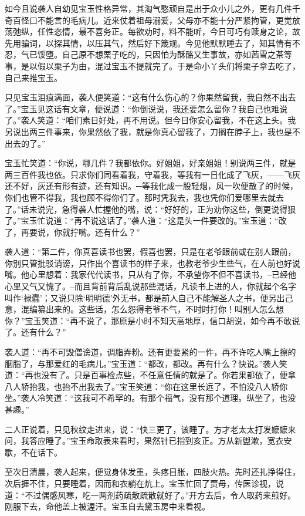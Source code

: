 \documentclass[12pt,oneside]{book}
\begin{document}
如今且说袭人自幼见宝玉性格异常，其淘气憨顽自是出于众小儿之外，更有几件千奇百怪口不能言的毛病儿。近来仗着祖母溺爱，父母亦不能十分严紧拘管，更觉放荡弛纵，任性恣情，最不喜务正。每欲劝时，料不能听，今日可巧有赎身之论，故先用骗词，以探其情，以压其气，然后好下箴规。今见他默默睡去了，知其情有不忍，气已馁堕。自己原不想栗子吃的，只因怕为酥酪又生事故，亦如茜雪之茶等事，是以假以栗子为由，混过宝玉不提就完了。于是命小丫头们将栗子拿去吃了，自己来推宝玉。

只见宝玉泪痕满面，袭人便笑道：“这有什么伤心的？你果然留我，我自然不出去了。”宝玉见这话有文章，便说道︰“你倒说说，我还要怎么留你？我自己也难说了。”袭人笑道：“咱们素日好处，再不用说。但今日你安心留我，不在这上头。我另说出两三件事来，你果然依了我，就是你真心留我了，刀搁在脖子上，我也是不出去的了。”

宝玉忙笑道：“你说，哪几件？我都依你。好姐姐，好亲姐姐！别说两三件，就是两三百件我也依。只求你们同看着我，守着我，等我有一日化成了飞灰，——飞灰还不好，灰还有形有迹，还有知识。─等我化成一股轻烟，风一吹便散了的时候，你们也管不得我，我也顾不得你们了。那时凭我去，我也凭你们爱哪里去就去了。”话未说完，急得袭人忙握他的嘴，说：“好好的，正为劝你这些，倒更说得狠了。”宝玉忙说道：“再不说这话了。”袭人道：“这是头一件要改的。”宝玉道：“改了，再要说，你就拧嘴。还有什么？”

袭人道：“第二件，你真喜读书也罢，假喜也罢，只是在老爷跟前或在别人跟前，你别只管批驳诮谤，只作出个喜读书的样子来，也教老爷少生些气，在人前也好说嘴。他心里想着：我家代代读书，只从有了你，不承望你不但不喜读书，--已经他心里又气又愧了。--而且背前背后乱说那些混话，凡读书上进的人，你就起个名字叫作‘禄蠹’；又说只除‘明明德’外无书，都是前人自己不能解圣人之书，便另出己意，混编纂出来的。这些话，怎么怨得老爷不气，不时时打你！叫别人怎么想你？”宝玉笑道：“再不说了，那原是小时不知天高地厚，信口胡说，如今再不敢说了。还有什么？”

袭人道：“再不可毁僧谤道，调脂弄粉。还有更要紧的一件，再不许吃人嘴上擦的胭脂了，与那爱红的毛病儿。”宝玉道：“都改，都改。再有什么？快说。”袭人笑道：“再也没有了。只是百事检点些，不任意任情的就是了。你若果都依了，便拿八人轿抬我，也抬不出我去了。”宝玉笑道：“你在这里长远了，不怕没八人轿你坐。”袭人冷笑道：“这我可不希罕的。有那个福气，没有那个道理。纵坐了，也没甚趣。”

二人正说着，只见秋纹走进来，说：“快三更了，该睡了。方才老太太打发嬷嬷来问，我答应睡了。”宝玉命取表来看时，果然针已指到亥正。方从新盥漱，宽衣安歇，不在话下。

至次日清晨，袭人起来，便觉身体发重，头疼目胀，四肢火热。先时还扎挣得住，次后捱不住，只要睡着，因而和衣躺在炕上。宝玉忙回了贾母，传医诊视，说道：“不过偶感风寒，吃一两剂药疏散疏散就好了。”开方去后，令人取药来煎好。刚服下去，命他盖上被渥汗。宝玉自去黛玉房中来看视。
\end{document}
